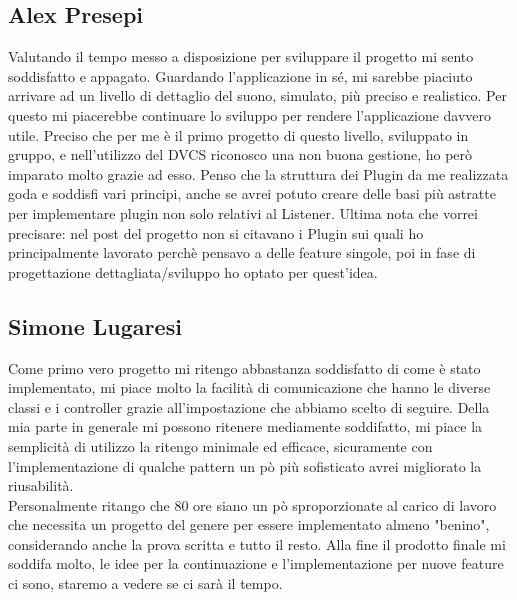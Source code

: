 \documentclass[a4paper,12pt]{report}
\begin{document}
\subsection*{Alex Presepi}
Valutando il tempo messo a disposizione per sviluppare il progetto mi sento soddisfatto e appagato. Guardando l'applicazione in sé, mi sarebbe piaciuto arrivare ad un livello di dettaglio del suono, simulato, più preciso e realistico. Per questo mi piacerebbe continuare lo sviluppo per rendere l'applicazione davvero utile. Preciso che per me è il primo progetto di questo livello, sviluppato in gruppo, e nell'utilizzo del DVCS riconosco una non buona gestione, ho però imparato molto grazie ad esso. Penso che la struttura dei Plugin da me realizzata goda e soddisfi vari principi, anche se avrei potuto creare delle basi più astratte per implementare plugin non solo relativi al Listener. Ultima nota che vorrei precisare: nel post del progetto non si citavano i Plugin sui quali ho principalmente lavorato perchè pensavo a delle feature singole, poi in fase di progettazione dettagliata/sviluppo ho optato per quest'idea.
\subsection*{Simone Lugaresi}
Come primo vero progetto mi ritengo abbastanza soddisfatto di come è stato implementato, mi piace molto la facilità di comunicazione che hanno le diverse classi e i controller grazie all'impostazione che abbiamo scelto di seguire. Della mia parte in generale mi possono ritenere mediamente soddifatto, mi piace la semplicità di utilizzo la ritengo minimale ed efficace, sicuramente con l'implementazione di qualche pattern un pò più sofisticato avrei migliorato la riusabilità.\\ Personalmente ritango che 80 ore siano un pò sproporzionate al carico di lavoro che necessita un progetto del genere per essere implementato almeno "benino", considerando anche la prova scritta e tutto il resto. Alla fine il prodotto finale mi soddifa molto, le idee per la continuazione e l'implementazione per nuove feature ci sono, staremo a vedere se ci sarà il tempo.

\appendix
\end{document}

